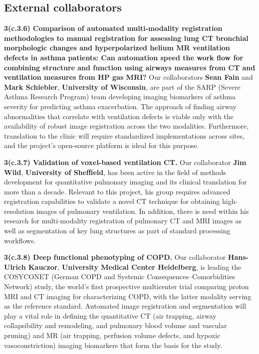 \documentclass[11pt,]{article}
\begin{document}
\subsection{External collaborators}\label{external-collaborators}

\textbf{3(c.3.6) Comparison of automated multi-modality registration
methodologies to manual registration for assessing lung CT bronchial
morphologic changes and hyperpolarized helium MR ventilation defects in
asthma patients: Can automation speed the work flow for combining
structure and function using airways measures from CT and ventilation
measures from HP gas MRI?} Our collaborators \textbf{Sean Fain} and
\textbf{Mark Schiebler}, \textbf{University of Wisconsin}, are part of
the SARP (Severe Asthma Research Program) team developing imaging
biomarkers of asthma severity for predicting asthma exacerbation. The
approach of finding airway abnormalities that correlate with ventilation
defects is viable only with the availability of robust image
registration across the two modalities. Furthermore, translation to the
clinic will require standardized implementations across sites, and the
project's open-source platform is ideal for this purpose.

\textbf{3(c.3.7) Validation of voxel-based ventilation CT.} Our
collaborator \textbf{Jim Wild}, \textbf{University of Sheffield}, has
been active in the field of methods development for quantitative
pulmonary imaging and its clinical translation for more than a decade.
Relevant to this project, his group requires advanced registration
capabilities to validate a novel CT technique for obtaining
high-resolution images of pulmonary ventilation. In addition, there is
need within his research for multi-modality registration of pulmonary CT
and MRI images as well as segmentation of key lung structures as part of
standard processing workflows.

\textbf{3(c.3.8) Deep functional phenotyping of COPD.} Our collaborator
\textbf{Hans-Ulrich Kauczor}, \textbf{University Medical Center
Heidelberg}, is leading the COSYCONET (German COPD and Systemic
Consequences--Comorbidities Network) study, the world's first
prospective multicenter trial comparing proton MRI and CT imaging for
characterizing COPD, with the latter modality serving as the reference
standard. Automated image registration and segmentation will play a
vital role in defining the quantitative CT (air trapping, airway
collapsibility and remodeling, and pulmonary blood volume and vascular
pruning) and MR (air trapping, perfusion volume defects, and hypoxic
vasoconstriction) imaging biomarkers that form the basis for the study.
\end{document}
